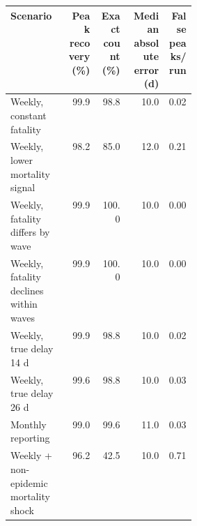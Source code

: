 \begin{tabular}{p{0.31\linewidth}rrrr}
\toprule
Scenario & Peak recovery (\%) & Exact count (\%) & Median absolute error (d) & False peaks/run \\
\midrule
Weekly, constant fatality & 99.9 & 98.8 & 10.0 & 0.02 \\
Weekly, lower mortality signal & 98.2 & 85.0 & 12.0 & 0.21 \\
Weekly, fatality differs by wave & 99.9 & 100.0 & 10.0 & 0.00 \\
Weekly, fatality declines within waves & 99.9 & 100.0 & 10.0 & 0.00 \\
Weekly, true delay 14 d & 99.9 & 98.8 & 10.0 & 0.02 \\
Weekly, true delay 26 d & 99.6 & 98.8 & 10.0 & 0.03 \\
Monthly reporting & 99.0 & 99.6 & 11.0 & 0.03 \\
Weekly + non-epidemic mortality shock & 96.2 & 42.5 & 10.0 & 0.71 \\
\bottomrule
\end{tabular}
